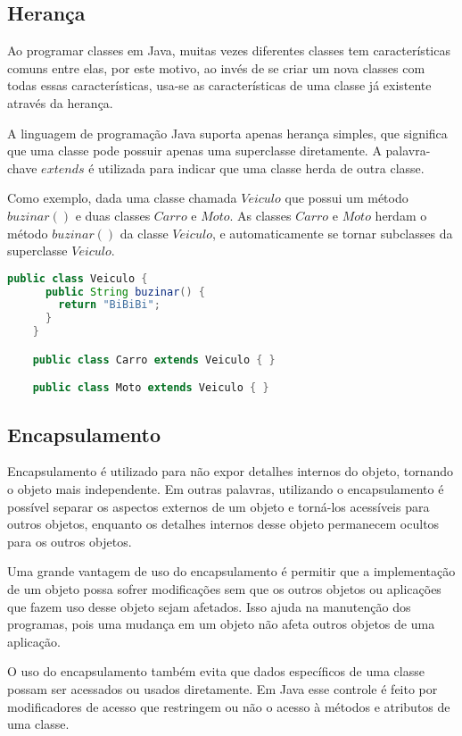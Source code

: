     \subsection{Herança}

    Ao programar classes em Java, muitas vezes diferentes classes tem características comuns entre elas, por este motivo, ao invés de se criar um nova classes com todas essas características, usa-se as características de uma classe já existente através da herança.

    A linguagem de programação Java suporta apenas herança simples, que significa que uma classe pode possuir apenas uma superclasse diretamente. A palavra-chave $extends$ é utilizada para indicar que uma classe herda de outra classe.

    Como exemplo, dada uma classe chamada $Veiculo$ que possui um método $buzinar()$ e duas classes $Carro$ e $Moto$. As classes $Carro$ e $Moto$ herdam o método $buzinar()$ da classe $Veiculo$, e automaticamente se tornar subclasses da superclasse $Veiculo$.

    \begin{lstlisting}[language=Java, mathescape=false]
    public class Veiculo {
      public String buzinar() {
        return "BiBiBi";
      }
    }

    public class Carro extends Veiculo { }

    public class Moto extends Veiculo { }
    \end{lstlisting}

    \subsection{Encapsulamento}

    Encapsulamento é utilizado para não expor detalhes internos do objeto, tornando o objeto mais independente. Em outras palavras, utilizando o encapsulamento é possível separar os aspectos externos de um objeto e torná-los acessíveis para outros objetos, enquanto os detalhes internos desse objeto permanecem ocultos para os outros objetos.

    Uma grande vantagem de uso do encapsulamento é permitir que a implementação de um objeto possa sofrer modificações sem que os outros objetos ou aplicações que fazem uso desse objeto sejam afetados. Isso ajuda na manutenção dos programas, pois uma mudança em um objeto não afeta outros objetos de uma aplicação.

    O uso do encapsulamento também evita que dados específicos de uma classe possam ser acessados ou usados diretamente. Em Java esse controle é feito por modificadores de acesso que restringem ou não o acesso à métodos e atributos de uma classe.

